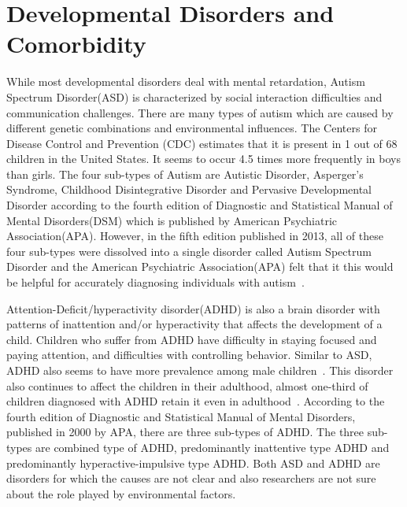 \section{Developmental Disorders and Comorbidity}
While most developmental disorders deal with mental retardation, Autism Spectrum Disorder(ASD) is characterized by social interaction difficulties and communication challenges. There are many types of autism which are caused by different genetic combinations and environmental influences. The Centers for Disease Control and Prevention (CDC) estimates that it is present in 1 out of 68 children in the United States. It seems to occur 4.5 times more frequently in boys than girls. The four sub-types of Autism are Autistic Disorder, Asperger’s Syndrome, Childhood Disintegrative Disorder and Pervasive Developmental Disorder according to the fourth edition of Diagnostic and Statistical Manual of Mental Disorders(DSM) which is published by American Psychiatric Association(APA). However, in the fifth edition published in 2013, all of these four sub-types were dissolved into a single disorder called Autism Spectrum Disorder and the American Psychiatric Association(APA) felt that it this would be helpful for accurately diagnosing individuals with autism~\cite{edition2013diagnostic}. 

Attention-Deficit/hyperactivity disorder(ADHD) is also a brain disorder with patterns of inattention and/or hyperactivity that affects the development of a child. Children who suffer from ADHD have difficulty in staying focused and paying attention, and difficulties with controlling behavior. Similar to ASD, ADHD also seems to have more prevalence among male children~\cite{visser2014trends}. This disorder also continues to affect the children in their adulthood, almost one-third of children diagnosed with ADHD retain it even in adulthood~\cite{barbaresi2013mortality}. According to the fourth edition of Diagnostic and Statistical Manual of Mental Disorders, published in 2000 by APA, there are three sub-types of ADHD. The three sub-types are combined type of ADHD, predominantly inattentive type ADHD and predominantly hyperactive-impulsive type ADHD. Both ASD and ADHD are disorders for which the causes are not clear and also researchers are not sure about the role played by environmental factors.

